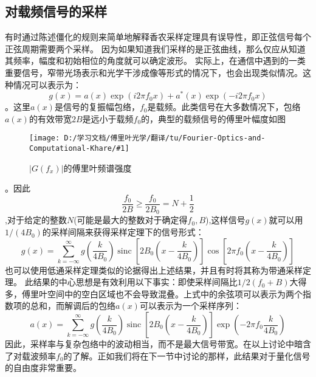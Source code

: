 \documentclass[10pt, UTF8]{ctexart}%
\newcommand {\InsertPic}[3]{\begin{figure}[htbp] \label{#2}\centering \texttt{[image: D:/学习文档/傅里叶光学/翻译/tu/Fourier-Optics-and-Computational-Khare/\#1]}\caption{#3} \end{figure}}%
\newcommand{\InsertEqution}[2]{\begin{equation}
  \label{#1}
   #2
 \end{equation}}
\newcommand{\InsertInlineEq}[1]{$#1$}
\begin{document}
\begin{sloppypar}
  \subsection{对载频信号的采样}
  有时通过陈述僵化的规则来简单地解释香农采样定理具有误导性，即正弦信号每个正弦周期需要两个采样。 因为如果知道我们采样的是正弦曲线，那么仅应从知道其频率，幅度和初始相位的角度就可以确定波形。 实际上，在通信中遇到的一类重要信号，窄带光场表示和光学干涉成像等形式的情况下，也会出现类似情况。这种情况可以表示为：\InsertEqution{3.11}{g(x)=a(x) \exp \left(i 2 \pi f_{0} x\right)+a^{*}(x) \exp \left(-i 2 \pi f_{0} x\right)}。这里\InsertInlineEq{a(x)}是信号的复振幅包络，\InsertInlineEq{f_0}是载频。此类信号在大多数情况下，包络\InsertInlineEq{a(x)}的有效带宽\InsertInlineEq{2B}是远小于载频\InsertInlineEq{f_0}的，典型的载频信号的傅里叶幅度如图\InsertPic{Image_181.png}{F3.1}{\InsertInlineEq{\left|G(f_x)\right|}的傅里叶频谱强度}。因此\InsertEqution{3.12}{\frac{f_{0}}{2 B} \geq \frac{f_{0}}{2 B_{0}}=N+\frac{1}{2}},对于给定的整数\InsertInlineEq{N}(可能是最大的整数对于确定得\InsertInlineEq{f_0,B}),这样信号\InsertInlineEq{g(x)}就可以用\InsertInlineEq{1/(4B_0)}的采样间隔来获得采样定理下的信号形式：\InsertEqution{3.13}{g(x)=\sum_{k=-\infty}^{\infty} g\left(\frac{k}{4 B_{0}}\right) \operatorname{sinc}\left[2 B_{0}\left(x-\frac{k}{4 B_{0}}\right)\right] \cos \left[2 \pi f_{0}\left(x-\frac{k}{4 B_{0}}\right)\right]}
  也可以使用低通采样定理类似的论据得出上述结果，并且有时将其称为带通采样定理。 此结果的中心思想是有效利用以下事实：即使采样间隔比\InsertInlineEq{1/2(f_0+B)}大得多，傅里叶空间中的空白区域也不会导致混叠。上式中的余弦项可以表示为两个指数项的总和，而解调后的包络\InsertInlineEq{a(x)}可以表示为一个采样序列：\InsertEqution{3.14}{a(x)=\sum_{k=-\infty}^{\infty} g\left(\frac{k}{4 B_{0}}\right) \operatorname{sinc}\left[2 B_{0}\left(x-\frac{k}{4 B_{0}}\right)\right] \exp \left(-2 \pi f_{0} \frac{k}{4 B_{0}}\right)}
  因此，采样率与复杂包络中的波动相当，而不是最大信号带宽。在以上讨论中暗含了对载波频率\InsertInlineEq{f_0}的了解。正如我们将在下一节中讨论的那样，此结果对于量化信号的自由度非常重要。
  \end{sloppypar}
\end{document}
